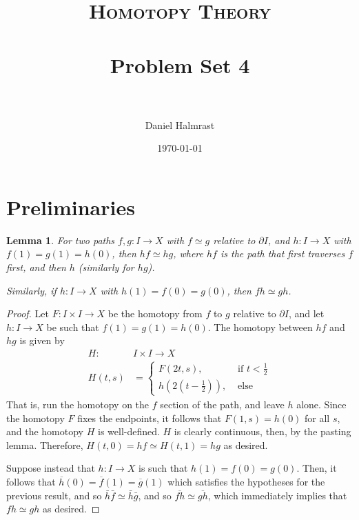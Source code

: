 \documentclass[fontsize=11pt]{scrartcl} %
\title{	
\normalfont \normalsize 
\textsc{Homotopy Theory} \\ [25pt] %
\horrule{0.5pt} \\[0.4cm] %
\huge Problem Set 4 \\ %
\horrule{2pt} \\[0.5cm] %
}
\author{Daniel Halmrast} %
\date{\normalsize\today} %
\numberwithin{equation}{section} %
\numberwithin{figure}{section} %
\numberwithin{table}{section} %
\newtheorem{lemma}{Lemma}
\begin{document}
\maketitle %

\section*{Preliminaries}

\begin{lemma}
    For two paths $f,g:I\to X$ with $f\simeq g$ relative to $\partial I$, and
    $h:I\to X$ with $f(1)=g(1)=h(0)$, then $hf\simeq hg$, where $hf$ is the
    path that first traverses $f$ first, and then $h$ (similarly for $hg$).

    Similarly, if $h:I\to X$ with $h(1) = f(0)=g(0)$, then $fh\simeq gh$.
\end{lemma}

\begin{proof}
    Let $F:I\times I\to X$ be the homotopy from $f$ to $g$ relative to $\partial
    I$, and let $h:I\to X$ be such that $f(1)=g(1)=h(0)$. The homotopy between
    $hf$ and $hg$ is given by
    \[
        \begin{aligned}
            H:&I\times I\to X\\
            H(t,s) &=
        \begin{cases}
            F(2t,s), &\text{ if }t<\frac{1}{2}\\
            h(2(t-\frac{1}{2})), &\text { else}
        \end{cases}
        \end{aligned}
    \]
    That is, run the homotopy on the $f$ section of the path, and leave $h$
    alone. Since the homotopy $F$ fixes the endpoints, it follows that
    $F(1,s)=h(0)$ for all $s$, and the homotopy $H$ is well-defined. $H$ is
    clearly continuous, then, by the pasting lemma. Therefore, $H(t,0) =
    hf\simeq H(t,1)=hg$ as desired.

    Suppose instead that $h:I\to X$ is such that $h(1)=f(0)=g(0)$. Then, it
    follows that $\overline{h}(0) = \overline{f}(1)=\overline{g}(1)$ which
    satisfies the hypotheses for the previous result, and so
    $\bar{h}\bar{f}\simeq \bar{h}\bar{g}$, and so
    $\overline{fh}\simeq \overline{gh}$, which immediately implies that
    $fh\simeq gh$ as desired.
\end{proof}

\end{document}
